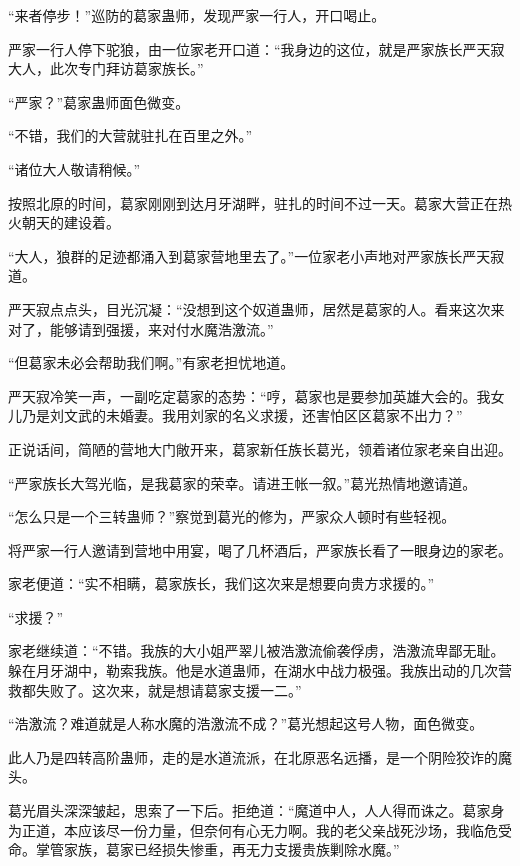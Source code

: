 
\begin{this_body}



“来者停步！”巡防的葛家蛊师，发现严家一行人，开口喝止。

严家一行人停下驼狼，由一位家老开口道：“我身边的这位，就是严家族长严天寂大人，此次专门拜访葛家族长。”

“严家？”葛家蛊师面色微变。

“不错，我们的大营就驻扎在百里之外。”

“诸位大人敬请稍候。”

按照北原的时间，葛家刚刚到达月牙湖畔，驻扎的时间不过一天。葛家大营正在热火朝天的建设着。

“大人，狼群的足迹都涌入到葛家营地里去了。”一位家老小声地对严家族长严天寂道。

严天寂点点头，目光沉凝：“没想到这个奴道蛊师，居然是葛家的人。看来这次来对了，能够请到强援，来对付水魔浩激流。”

“但葛家未必会帮助我们啊。”有家老担忧地道。

严天寂冷笑一声，一副吃定葛家的态势：“哼，葛家也是要参加英雄大会的。我女儿乃是刘文武的未婚妻。我用刘家的名义求援，还害怕区区葛家不出力？”

正说话间，简陋的营地大门敞开来，葛家新任族长葛光，领着诸位家老亲自出迎。

“严家族长大驾光临，是我葛家的荣幸。请进王帐一叙。”葛光热情地邀请道。

“怎么只是一个三转蛊师？”察觉到葛光的修为，严家众人顿时有些轻视。

将严家一行人邀请到营地中用宴，喝了几杯酒后，严家族长看了一眼身边的家老。

家老便道：“实不相瞒，葛家族长，我们这次来是想要向贵方求援的。”

“求援？”

家老继续道：“不错。我族的大小姐严翠儿被浩激流偷袭俘虏，浩激流卑鄙无耻。躲在月牙湖中，勒索我族。他是水道蛊师，在湖水中战力极强。我族出动的几次营救都失败了。这次来，就是想请葛家支援一二。”

“浩激流？难道就是人称水魔的浩激流不成？”葛光想起这号人物，面色微变。

此人乃是四转高阶蛊师，走的是水道流派，在北原恶名远播，是一个阴险狡诈的魔头。

葛光眉头深深皱起，思索了一下后。拒绝道：“魔道中人，人人得而诛之。葛家身为正道，本应该尽一份力量，但奈何有心无力啊。我的老父亲战死沙场，我临危受命。掌管家族，葛家已经损失惨重，再无力支援贵族剿除水魔。”


\end{this_body}
